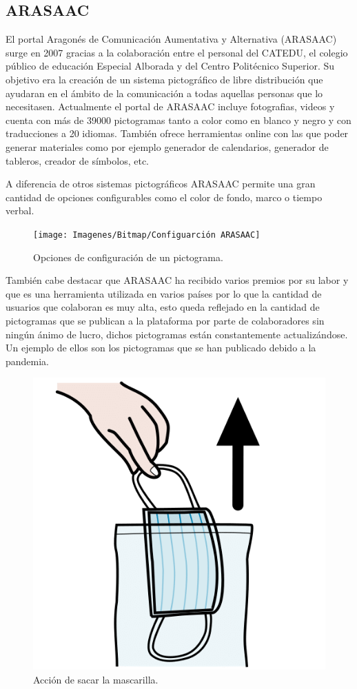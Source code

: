 \subsection{ARASAAC}

El portal Aragonés de Comunicación Aumentativa y Alternativa (ARASAAC) surge en 2007 gracias a la colaboración entre el personal del CATEDU, el colegio público de educación Especial Alborada y del Centro Politécnico Superior. Su objetivo era la creación de un sistema pictográfico de libre distribución que ayudaran en el ámbito de la comunicación a todas aquellas personas que lo necesitasen.
Actualmente el portal de ARASAAC incluye fotografias, videos y cuenta con más de 39000 pictogramas tanto a color como en blanco y negro y con traducciones a 20 idiomas. También ofrece herramientas online con las que poder generar materiales como por ejemplo generador de calendarios, generador de tableros, creador de símbolos, etc.

A diferencia de otros sistemas pictográficos ARASAAC permite una gran cantidad de opciones configurables como el color de fondo, marco o tiempo verbal.


\begin{figure}[h!]
	\centering
	\texttt{[image: Imagenes/Bitmap/Configuarción ARASAAC]}
	\caption{Opciones de configuración de un pictograma.}
	\label{fig:configuarcion-arasaac}
\end{figure}



También cabe destacar que ARASAAC ha recibido varios premios por su labor y que es una herramienta utilizada en varios países por lo que la cantidad de usuarios que colaboran es muy alta, esto queda reflejado en la cantidad de pictogramas que se publican a la plataforma por parte de colaboradores sin ningún ánimo de lucro, dichos pictogramas están constantemente actualizándose. Un ejemplo de ellos son los pictogramas que se han publicado debido a la pandemia.

\newpage
\begin{figure}[h!]
	\centering
	\includegraphics[width=0.2\linewidth]{Imagenes/Bitmap/Picto Mascarilla}
	\caption{Acción de sacar la mascarilla.}
	\label{fig:picto-mascarilla}
\end{figure}

